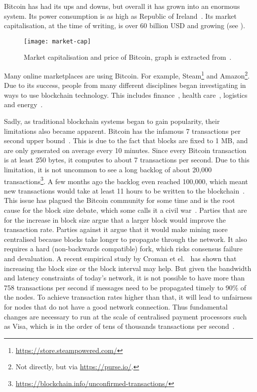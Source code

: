 Bitcoin has had its ups and downs, but overall it has grown into an enormous system.
Its power consumption is as high as Republic of Ireland~\cite{o2014bitcoin}.
Its market capitalisation, at the time of writing, is over 60 billion USD and growing (see ).
\begin{figure}[h]
\centering
\texttt{[image: market-cap]}
\caption{Market capitalisation and price of Bitcoin, graph is extracted from~\cite{bitcoinmarketcap}.}
\label{fig:market-cap}
\end{figure}
Many online marketplaces are using Bitcoin.
For example, Steam\footnote{\url{https://store.steampowered.com/}} and Amazon\footnote{Not directly, but via \url{https://purse.io/}.}.
Due to its success, people from many different disciplines began investigating in ways to use blockchain technology.
This includes finance~\cite{finance}, health care~\cite{healthcare}, logistics~\cite{supplychain} and energy~\cite{energy}.

Sadly, as traditional blockchain systems began to gain popularity,
their limitations also became apparent.
Bitcoin has the infamous 7 transactions per second upper bound~\cite{vukolic2015quest}.
This is due to the fact that blocks are fixed to 1 MB,
and are only generated on average every 10 minutes.
Since every Bitcoin transaction is at least 250 bytes, it computes to about 7 transactions per second.
Due to this limitation, it is not uncommon to see a long backlog of about 20,000 transactions\footnote{\url{https://blockchain.info/unconfirmed-transactions/}}.
A few months ago the backlog even reached 100,000, which meant new transactions would take at least 11 hours to be written to the blockchain~\cite{bitcoinbacklog}.
This issue has plagued the Bitcoin community for some time and is the root cause for the block size debate, which some calls it a civil war~\cite{bitcoincivilwar}.
Parties that are for the increase in block size argue that a larger block would improve the transaction rate.
Parties against it argue that it would make mining more centralised because blocks take longer to propagate through the network.
It also requires a hard (non-backwards compatible) fork,
which risks consensus failure and devaluation.
A recent empirical study by Croman et el.~\cite{croman2016scaling} has shown that increasing the block size or the block interval may help.
But given the bandwidth and latency constraints of today's network,
it is not possible to have more than 758 transactions per second if messages need to be propagated timely to 90\% of the nodes.
To achieve transaction rates higher than that, it will lead to unfairness for nodes that do not have a good network connection.
Thus fundamental changes are necessary to run at the scale of centralised payment processors such as Visa,
which is in the order of tens of thousands transactions per second~\cite{visa}.

